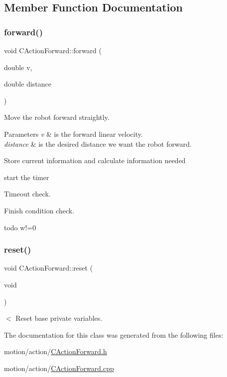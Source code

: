 \subsection{Member Function Documentation}
\mbox{\label{classmotion_1_1CActionForward_abc4d3b39f49514f9d3f64a92393aa6d2}} 
\subsubsection{\texorpdfstring{forward()}{forward()}}
{\footnotesize\ttfamily void C\+Action\+Forward\+::forward (\begin{DoxyParamCaption}\item[{double}]{v,  }\item[{double}]{distance }\end{DoxyParamCaption})}

Move the robot forward straightly. 
\begin{DoxyParams}{Parameters}
{\em v} & is the forward linear velocity. \\
\hline
{\em distance} & is the desired distance we want the robot forward. \\
\hline
\end{DoxyParams}
Store current information and calculate information needed

start the timer

Timeout check.

Finish condition check.

todo w!=0 \mbox{\label{classmotion_1_1CActionForward_af7c72ffee0c2f41c8608259ef3268f23}} 
\subsubsection{\texorpdfstring{reset()}{reset()}}
{\footnotesize\ttfamily void C\+Action\+Forward\+::reset (\begin{DoxyParamCaption}\item[{void}]{ }\end{DoxyParamCaption})}

$<$ Reset base private variables. 

The documentation for this class was generated from the following files\+:\begin{DoxyCompactItemize}
\item 
motion/action/\mbox{\hyperlink{CActionForward_8h}{C\+Action\+Forward.\+h}}\item 
motion/action/\mbox{\hyperlink{CActionForward_8cpp}{C\+Action\+Forward.\+cpp}}\end{DoxyCompactItemize}
